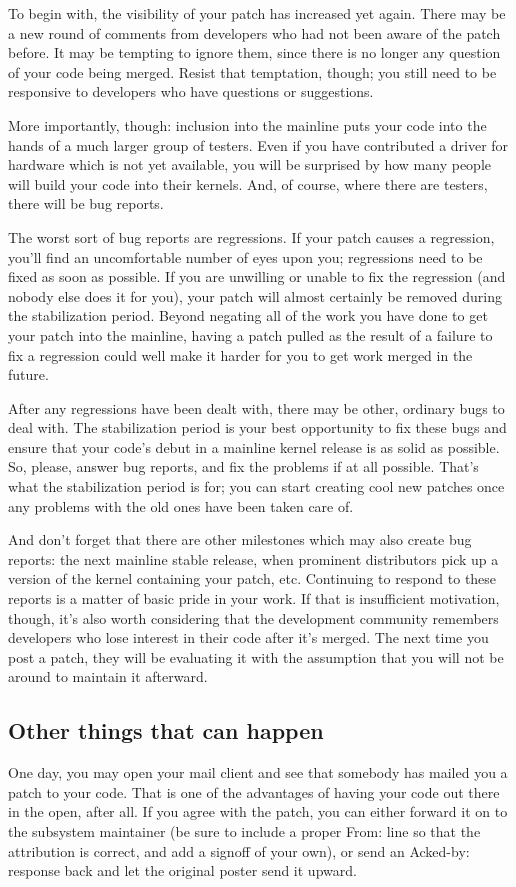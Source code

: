 \documentclass[a4paper,8pt,english]{sphinxmanual}
\begin{document}
To begin with, the visibility of your patch has increased yet again.  There
may be a new round of comments from developers who had not been aware of
the patch before.  It may be tempting to ignore them, since there is no
longer any question of your code being merged.  Resist that temptation,
though; you still need to be responsive to developers who have questions or
suggestions.

More importantly, though: inclusion into the mainline puts your code into
the hands of a much larger group of testers.  Even if you have contributed
a driver for hardware which is not yet available, you will be surprised by
how many people will build your code into their kernels.  And, of course,
where there are testers, there will be bug reports.

The worst sort of bug reports are regressions.  If your patch causes a
regression, you'll find an uncomfortable number of eyes upon you;
regressions need to be fixed as soon as possible.  If you are unwilling or
unable to fix the regression (and nobody else does it for you), your patch
will almost certainly be removed during the stabilization period.  Beyond
negating all of the work you have done to get your patch into the mainline,
having a patch pulled as the result of a failure to fix a regression could
well make it harder for you to get work merged in the future.

After any regressions have been dealt with, there may be other, ordinary
bugs to deal with.  The stabilization period is your best opportunity to
fix these bugs and ensure that your code's debut in a mainline kernel
release is as solid as possible.  So, please, answer bug reports, and fix
the problems if at all possible.  That's what the stabilization period is
for; you can start creating cool new patches once any problems with the old
ones have been taken care of.

And don't forget that there are other milestones which may also create bug
reports: the next mainline stable release, when prominent distributors pick
up a version of the kernel containing your patch, etc.  Continuing to
respond to these reports is a matter of basic pride in your work.  If that
is insufficient motivation, though, it's also worth considering that the
development community remembers developers who lose interest in their code
after it's merged.  The next time you post a patch, they will be evaluating
it with the assumption that you will not be around to maintain it
afterward.


\subsection{Other things that can happen}
\label{process/6.Followthrough:other-things-that-can-happen}
One day, you may open your mail client and see that somebody has mailed you
a patch to your code.  That is one of the advantages of having your code
out there in the open, after all.  If you agree with the patch, you can
either forward it on to the subsystem maintainer (be sure to include a
proper From: line so that the attribution is correct, and add a signoff of
your own), or send an Acked-by: response back and let the original poster
send it upward.
\end{document}
